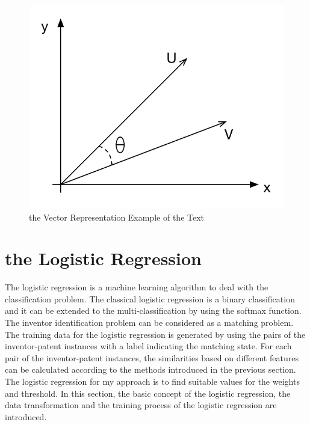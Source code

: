 \begin{figure}
\begin{center}
\includegraphics[scale=0.8]{VectorSpace.pdf}
\caption{the Vector Representation Example of the Text}
\end{center}
\end{figure}

\vspace{6pt}

\section{the Logistic Regression}
The logistic regression is a machine learning algorithm to deal with the classification problem. The classical logistic regression is a binary classification and it can be extended to the multi-classification by using the softmax function. The inventor identification problem can be considered as a matching problem. The training data for the logistic regression is generated by using the pairs of the inventor-patent instances with a label indicating the matching state. For each pair of the inventor-patent instances, the similarities based on different features can be calculated according to the methods introduced in the previous section. The logistic regression for my approach is to find suitable values for the weights and threshold. In this section, the basic concept of the logistic regression, the data transformation and the training process of the logistic regression are introduced.


